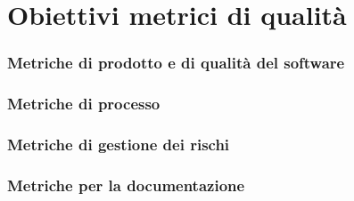 \section{Obiettivi metrici di qualità}
\subsubsection{Metriche di prodotto e di qualità del software}



\subsubsection{Metriche di processo}


\subsubsection{Metriche di gestione dei rischi}


\subsubsection{Metriche per la documentazione}

